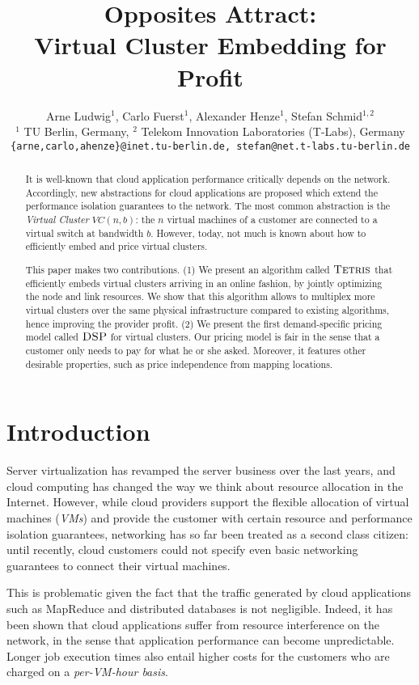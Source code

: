 \documentclass{sig-alternate-per}
\title{Opposites Attract: \\ Virtual Cluster Embedding for Profit}
\author {
   Arne Ludwig$^1$,
   Carlo Fuerst$^1$,
   Alexander Henze$^1$,
   Stefan Schmid$^{1,2}$\\
\small{$^1$ TU Berlin, Germany, $^2$ Telekom Innovation Laboratories (T-Labs),
Germany}\\
\small{\texttt{\{arne,carlo,ahenze\}@inet.tu-berlin.de, stefan@net.t-labs.tu-berlin.de}}\\
}
\newcommand{\ALG}{\textsc{Tetris}}
\newcommand{\pricing}{\textsc{DSP}}
\begin{document}
\maketitle

\sloppy

\begin{abstract}
It is well-known that cloud application performance critically depends
on the network. Accordingly, new abstractions for cloud applications are
proposed which extend the performance isolation guarantees to the network.
The most common abstraction is the \emph{Virtual Cluster} $VC(n,b)$: the $n$ virtual
machines of a customer are connected to a virtual switch at bandwidth $b$.
However, today, not much is known about how to efficiently embed and price
virtual clusters.

This paper makes two contributions. (1) We present an algorithm called $\ALG$ that
efficiently
embeds virtual clusters arriving in an online fashion, by jointly optimizing the node and link resources.
We show that this algorithm allows to multiplex more virtual clusters over the same physical
infrastructure compared to existing algorithms,
hence improving the provider profit. (2)
We present the first demand-specific pricing model called $\pricing$ for virtual clusters. Our pricing model is fair in the sense
that a customer only needs to pay for what he or she asked. Moreover, it
features other desirable properties, such as price independence from mapping locations.
\end{abstract}

\section{Introduction}

Server virtualization has revamped the server business over the last years,
and cloud computing has changed the way we think about resource allocation in the Internet.
However, while cloud providers support the flexible allocation of virtual machines (\emph{VMs}) and
provide the customer with certain resource and performance isolation guarantees,
networking has so far been treated as a second class citizen: until recently,
cloud customers could not specify even basic networking guarantees to connect their virtual
machines.

This is problematic given the fact that the traffic generated by cloud applications such as MapReduce and distributed
databases
is not negligible. Indeed, it has been shown that cloud applications suffer from resource interference
on the network, in the sense that application performance can become unpredictable. Longer job execution times
also entail higher costs for the customers who are charged on a \emph{per-VM-hour basis}.~\cite{short-talk-about}
\end{document}
